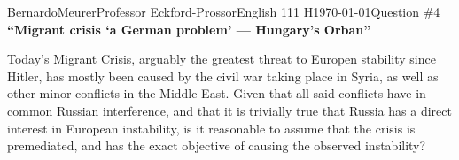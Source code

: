 \documentclass[12pt,letterpaper]{article}
\begin{document}
\begin{mla}{Bernardo}{Meurer}{Professor Eckford-Prossor}{English 111 H}{\today}{Question \#4}
    \noindent\textbf{``Migrant crisis `a German problem' --- Hungary's Orban''}

    Today's Migrant Crisis, arguably the greatest threat to Europen stability since Hitler, has mostly been caused by the civil war taking place in Syria, as well as other minor conflicts in the Middle East.
    Given that all said conflicts have in common Russian interference, and that it is trivially true that Russia has a direct interest in European instability, is it reasonable to assume that the crisis is premediated, and has the exact objective of causing the observed instability?
\end{mla}
\end{document}
